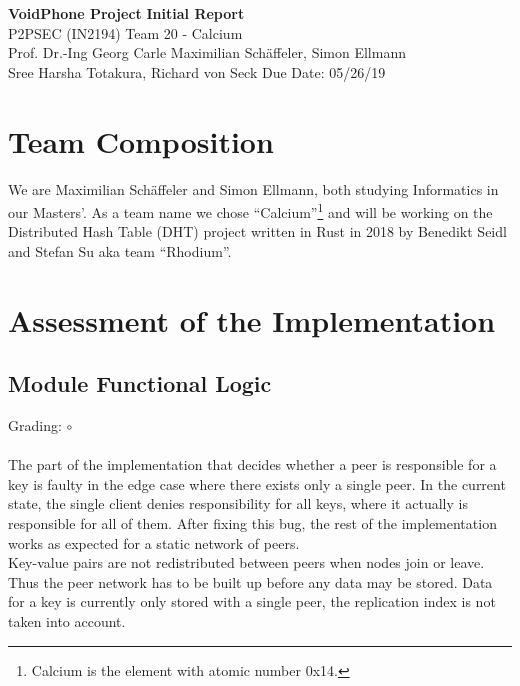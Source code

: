 \documentclass[a4paper, 11pt]{article}
\begin{document}
\noindent
\large\textbf{VoidPhone Project} \hfill \textbf{Initial Report} \\
\normalsize P2PSEC (IN2194)  \hfill Team 20 - Calcium\\
Prof. Dr.-Ing Georg Carle \hfill Maximilian Schäffeler, Simon Ellmann \\
Sree Harsha Totakura, Richard von Seck \hfill Due Date: 05/26/19


\section*{Team Composition}
We are Maximilian Schäffeler and Simon Ellmann, both studying Informatics in our Masters'.
As a team name we chose ``Calcium''\footnote{Calcium is the element with atomic number 0x14.} and will be working on the Distributed Hash Table (DHT) project written in Rust \cite{Rust} in 2018 by Benedikt Seidl and Stefan Su aka team ``Rhodium''.


\section*{Assessment of the Implementation}
\subsection*{Module Functional Logic}
Grading: $\circ$\\
\\
The part of the implementation that decides whether a peer is responsible for a key is faulty in the edge case where there exists only a single peer.
In the current state, the single client denies responsibility for all keys, where it actually is responsible for all of them.
After fixing this bug, the rest of the implementation works as expected for a static network of peers.
\\
Key-value pairs are not redistributed between peers when nodes join or leave. Thus the peer network has to be built up before any data may be stored.
Data for a key is currently only stored with a single peer, the replication index is not taken into account.
\end{document}
